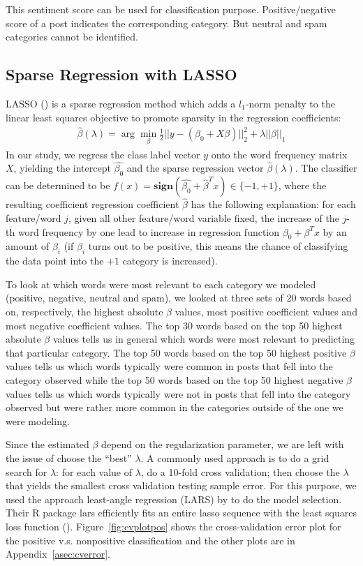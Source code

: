 \documentclass[11pt]{article}
\newcommand{\1}[1]{{\mathbf 1}\left\{#1\right\}}        %
\begin{document}
This sentiment score can be used for classification purpose. Positive/negative score of a post indicates the corresponding category. But neutral and spam categories cannot be identified. 

  
\subsection{Sparse Regression with LASSO}

LASSO (\cite{tibshirani1996regression}) is a sparse regression method which adds a $l_1$-norm penalty to the linear least squares objective to promote sparsity in the regression coefficients:
\begin{align}
\label{eq:Lasso}
\hat{\beta}(\lambda) = \arg \min_\beta \frac{1}{2}||y-(\beta_0+X\beta)||_2^2 + \lambda ||\beta||_1
\end{align}
In our study, we regress the class label vector $y$ onto the word frequency matrix $X$, yielding the intercept $\hat{\beta_0}$ and the sparse regression vector $\hat{\beta}(\lambda)$. The classifier can be determined to be $f(x) = \textbf{sign}(\hat{\beta_0}+\hat{\beta}^Tx)\in\{-1,+1\}$, where the resulting coefficient regression coefficient $\hat{\beta}$ has the following explanation: for each feature/word $j$, given all other feature/word variable fixed, the increase of the $j$-th word frequency by one lead to increase in regression function $\beta_0+\beta^Tx$ by an amount of $\beta_i$ (if $\beta_i$ turns out to be positive, this means the chance of classifying the data point into the $+1$ category is increased).

To look at which words were most relevant to each category we modeled (positive, negative, neutral and spam), we looked at three sets of 20 words based on, respectively, the highest absolute $\beta$ values, most positive coefficient values and most negative coefficient values. The top 30 words based on the top 50 highest absolute $\beta$ values tells us in general which words were most relevant to predicting that particular category.  The top 50 words based on the top 50 highest positive $\beta$ values tells us which words typically were common in posts that fell into the category observed while the top 50 words based on the top 50 highest negative $\beta$ values tells us which words typically were not in posts that fell into the category observed but were rather more common in the categories outside of the one we were modeling.

Since the estimated $\beta$ depend on the regularization parameter, we are left with the issue of choose the ``best'' $\lambda$. A commonly used approach is to do a grid search for $\lambda$: for each value of $\lambda$, do a 10-fold cross validation; then choose the $\lambda$ that yields the smallest cross validation testing sample error. For this purpose, we used the approach least-angle regression (LARS) by \cite{efron2004least} to do the model selection. Their {\sffamily R} package {\sffamily lars} efficiently fits an entire lasso sequence with the least squares loss function (\cite{Rlars}). Figure~\ref{fig:cvplotpos} shows the cross-validation error plot for the positive v.s. nonpositive classification and the other plots are in Appendix~\ref{asec:cverror}.
\end{document}
